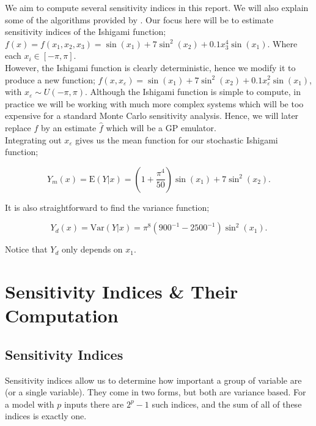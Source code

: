 \documentclass[12pt]{article}
\newcommand{\E}{\text{E}}
\newcommand{\var}{\text{Var}}
\begin{document}
We aim to compute several sensitivity indices in this report. We will also explain some of the algorithms provided by \citet{Sobol1993}. Our focus here will be to estimate sensitivity indices of the Ishigami function; $f(x) = f(x_1, x_2, x_3) = \sin(x_1) + 7 \sin^2(x_2) + 0.1 x_3^4 \sin(x_1)$. Where each $x_i \in [-\pi, \pi]$. \\

However, the Ishigami function is clearly deterministic, hence we modify it to produce a new function; $f(x, x_\varepsilon) = \sin(x_1) + 7 \sin^2(x_2) + 0.1 x_\varepsilon^2 \sin(x_1)$, with $x_\varepsilon \sim U(-\pi, \pi)$. Although the Ishigami function is simple to compute, in practice we will be working with much more complex systems which will be too expensive for a standard Monte Carlo sensitivity analysis. Hence, we will later replace $f$ by an estimate $\hat{f}$ which will be a GP emulator.\\

Integrating out $x_\varepsilon$ gives us the mean function for our stochastic Ishigami function;

\begin{equation}
	Y_m(x) = \E(Y| x) = \left( 1 + \frac{\pi^4}{50} \right) \sin(x_1) + 7\sin^2(x_2).
\end{equation}

It is also straightforward to find the variance function;

\begin{equation}
	Y_d(x) = \var(Y|x) = \pi^8 (900^{-1} - 2500^{-1}) \sin^2(x_1).
\end{equation}

Notice that $Y_d$ only depends on $x_1$.

\section{Sensitivity Indices \& Their Computation}

\subsection{Sensitivity Indices}

Sensitivity indices allow us to determine how important a group of variable are (or a single variable). They come in two forms, but both are variance based. For a model with $p$ inputs there are $2^p - 1$ such indices, and the sum of all of these indices is exactly one.\\
\end{document}
